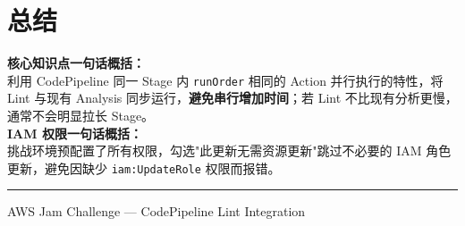 \documentclass[12pt, a4paper]{article}
\begin{document}
\section{总结}

\begin{successbox}
    \textbf{核心知识点一句话概括：}\\[0.5em]
    利用 CodePipeline 同一 Stage 内 \texttt{runOrder} 相同的 Action 并行执行的特性，将 Lint 与现有 Analysis 同步运行，\textbf{避免串行增加时间}；若 Lint 不比现有分析更慢，通常不会明显拉长 Stage。\\[0.5em]
    \textbf{IAM 权限一句话概括：}\\[0.5em]
    挑战环境预配置了所有权限，勾选"此更新无需资源更新"跳过不必要的 IAM 角色更新，避免因缺少 \texttt{iam:UpdateRole} 权限而报错。
\end{successbox}

\vspace{2em}
{\color{awsorange}\rule{\linewidth}{1.5pt}}
\begin{center}
    \small\color{codegray} AWS Jam Challenge --- CodePipeline Lint Integration
\end{center}
\end{document}
